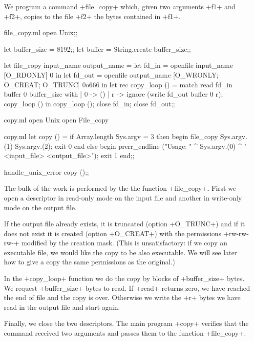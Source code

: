 We program a command \ml+file_copy+ which, given two arguments 
\ml+f1+ and \ml+f2+, copies to the file \ml+f2+ the bytes contained 
in \ml+f1+.
%
\begin{listingcodefile}{file_copy.ml}
open Unix;;

let buffer_size = 8192;;
let buffer = String.create buffer_size;;

let file_copy input_name output_name =
  let fd_in = openfile input_name [O_RDONLY] 0 in
  let fd_out = openfile output_name [O_WRONLY; O_CREAT; O_TRUNC] 0o666 in
  let rec copy_loop () = match read fd_in buffer 0 buffer_size with
    |  0 -> ()
    | r -> ignore (write fd_out buffer 0 r); copy_loop () 
  in
  copy_loop ();
  close fd_in;
  close fd_out;;
\end{listingcodefile}
%
\begin{codefile}{copy.ml}
open Unix
open File_copy
\end{codefile}
%
\begin{listingcodefile}{copy.ml}
let copy () =
  if Array.length Sys.argv = 3 then begin
    file_copy Sys.argv.(1) Sys.argv.(2);
    exit 0
  end else begin
    prerr_endline 
      ("Usage: " ^ Sys.argv.(0) ^ " <input_file> <output_file>");
    exit 1
  end;;

handle_unix_error copy ();;
\end{listingcodefile}
%

The bulk of the work is performed by the the function \ml+file_copy+.
First we open a descriptor in read-only mode on the input file and
another in write-only mode on the output file. 

If the output file already exists, it is truncated (option
\ml+O_TRUNC+) and if it does not exist it is created (option
\ml+O_CREAT+) with the permissions \ml+rw-rw-rw-+ modified by the creation
mask. (This is unsatisfactory: if we copy an executable file, we would
like the copy to be also executable. We will see later how to give
a copy the same permissions as the original.)

In the \ml+copy_loop+ function we do the copy by blocks of
\ml+buffer_size+ bytes. We request \ml+buffer_size+ bytes to read. If
\ml+read+ returns zero, we have reached the end of file and the copy
is over. Otherwise we write the \ml+r+ bytes we have read in the
output file and start again.

Finally, we close the two descriptors. The main program \ml+copy+
verifies that the command received two arguments and passes them to
the function \ml+file_copy+.

